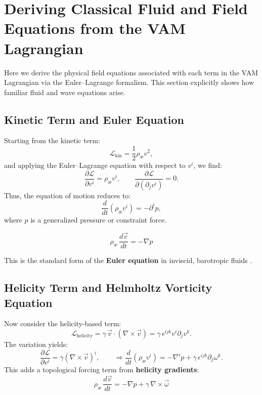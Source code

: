 \section{Deriving Classical Fluid and Field Equations from the VAM Lagrangian}

Here we derive the physical field equations associated with each term in the VAM Lagrangian via the Euler–Lagrange formalism. This section explicitly shows how familiar fluid and wave equations arise.

\subsection*{Kinetic Term and Euler Equation}

Starting from the kinetic term:
\[
    \mathcal{L}_{\text{kin}} = \frac{1}{2} \rho_\text{\ae} v^2,
\]
and applying the Euler--Lagrange equation with respect to $v^i$, we find:
\[
    \frac{\partial \mathcal{L}}{\partial v^i} = \rho_\text{\ae} v^i, \qquad
    \frac{\partial \mathcal{L}}{\partial (\partial_j v^i)} = 0.
\]
Thus, the equation of motion reduces to:
\[
    \frac{d}{dt}(\rho_\text{\ae} v^i) = -\partial^i p,
\]
where \( p \) is a generalized pressure or constraint force.

\begin{equation}
    \boxed{
        \rho_\text{\ae}\, \frac{d \vec{v}}{dt} = -\nabla p
    }
\end{equation}

This is the standard form of the \textbf{Euler equation} in inviscid, barotropic fluids \cite{khalatnikov2000}.

\subsection*{Helicity Term and Helmholtz Vorticity Equation}

Now consider the helicity-based term:
\[
    \mathcal{L}_{\text{helicity}} = \gamma\, \vec{v} \cdot (\nabla \times \vec{v}) = \gamma\, \epsilon^{ijk} v^i \partial_j v^k.
\]
The variation yields:
\[
    \frac{\partial \mathcal{L}}{\partial v^i} = \gamma (\nabla \times \vec{v})^i, \qquad
    \Rightarrow \frac{d}{dt}(\rho_\text{\ae} v^i) = -\nabla^i p + \gamma\, \epsilon^{ijk} \partial_j \omega^k.
\]
This adds a topological forcing term from \textbf{helicity gradients}:
\begin{equation}
    \boxed{
        \rho_\text{\ae}\, \frac{d \vec{v}}{dt} = -\nabla p + \gamma\, \nabla \times \vec{\omega}
    }
\end{equation}

